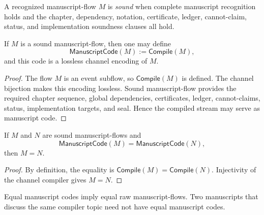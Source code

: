 \begin{definition}
\label{def:chapter-manuscript-sound-manuscript-flow}
A recognized manuscript-flow $M$ is \emph{sound} when complete manuscript recognition holds and the chapter, dependency, notation, certificate, ledger, cannot-claim, status, and implementation soundness clauses all hold.
\end{definition}

\begin{theorem}
\label{thm:chapter-manuscript-sound-manuscript-code}
If $M$ is a sound manuscript-flow, then one may define
$$
  \mathsf{ManuscriptCode}(M):=\mathsf{Compile}(M),
$$
and this code is a lossless channel encoding of $M$.
\end{theorem}

\begin{proof}
The flow $M$ is an event subflow, so $\mathsf{Compile}(M)$ is defined. The channel bijection makes this encoding lossless. Sound manuscript-flow provides the required chapter sequence, global dependencies, certificates, ledger, cannot-claims, status, implementation targets, and seal. Hence the compiled stream may serve as manuscript code.
\end{proof}

\begin{theorem}
\label{thm:chapter-manuscript-manuscript-code-injective}
If $M$ and $N$ are sound manuscript-flows and
$$
  \mathsf{ManuscriptCode}(M)=\mathsf{ManuscriptCode}(N),
$$
then $M=N$.
\end{theorem}

\begin{proof}
By definition, the equality is $\mathsf{Compile}(M)=\mathsf{Compile}(N)$. Injectivity of the channel compiler gives $M=N$.
\end{proof}

\begin{corollary}
\label{cor:chapter-manuscript-code-not-topic}
Equal manuscript codes imply equal raw manuscript-flows. Two manuscripts that discuss the same compiler topic need not have equal manuscript codes.
\end{corollary}

